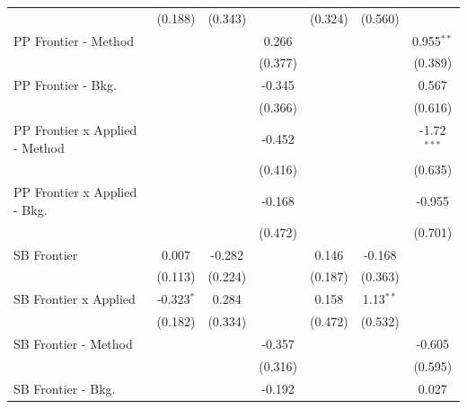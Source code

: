 \begin{tabular}{lcccccc}
                                  & (0.188)       & (0.343)       &               & (0.324)        & (0.560)       &   \\   
   PP Frontier - Method           &               &               & 0.266         &                &               & 0.955$^{**}$\\   
                                  &               &               & (0.377)       &                &               & (0.389)\\   
   PP Frontier - Bkg.             &               &               & -0.345        &                &               & 0.567\\   
                                  &               &               & (0.366)       &                &               & (0.616)\\   
   PP Frontier x Applied - Method &               &               & -0.452        &                &               & -1.72$^{***}$\\   
                                  &               &               & (0.416)       &                &               & (0.635)\\   
   PP Frontier x Applied - Bkg.   &               &               & -0.168        &                &               & -0.955\\   
                                  &               &               & (0.472)       &                &               & (0.701)\\   
   SB Frontier                    & 0.007         & -0.282        &               & 0.146          & -0.168        &   \\   
                                  & (0.113)       & (0.224)       &               & (0.187)        & (0.363)       &   \\   
   SB Frontier x Applied          & -0.323$^{*}$  & 0.284         &               & 0.158          & 1.13$^{**}$   &   \\   
                                  & (0.182)       & (0.334)       &               & (0.472)        & (0.532)       &   \\   
   SB Frontier - Method           &               &               & -0.357        &                &               & -0.605\\   
                                  &               &               & (0.316)       &                &               & (0.595)\\   
   SB Frontier - Bkg.             &               &               & -0.192        &                &               & 0.027\\   

\end{tabular}
